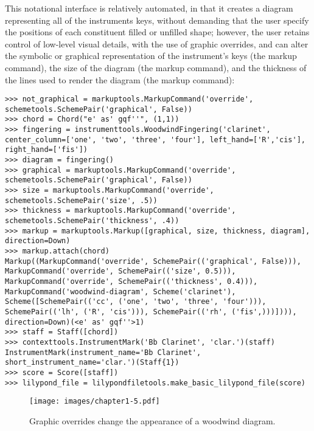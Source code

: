 \noindent This notational interface is relatively automated, in that it creates a diagram representing all of the instruments keys, without demanding that the user specify the positions of each constituent filled or unfilled shape; however, the user retains control of low-level visual details, with the use of graphic overrides, and can alter the symbolic or graphical representation of the instrument's keys (the  markup command), the size of the diagram (the  markup command), and the thickness of the lines used to render the diagram (the  markup command):
\begin{lstlisting}[basicstyle=\scriptsize\ttfamily, breaklines=True, tabsize=4, showtabs=false, showspaces=false]
>>> not_graphical = markuptools.MarkupCommand('override', schemetools.SchemePair('graphical', False))
>>> chord = Chord("e' as' gqf''", (1,1))
>>> fingering = instrumenttools.WoodwindFingering('clarinet', center_column=['one', 'two', 'three', 'four'], left_hand=['R','cis'], right_hand=['fis'])
>>> diagram = fingering()
>>> graphical = markuptools.MarkupCommand('override', schemetools.SchemePair('graphical', False))
>>> size = markuptools.MarkupCommand('override', schemetools.SchemePair('size', .5))
>>> thickness = markuptools.MarkupCommand('override', schemetools.SchemePair('thickness', .4))
>>> markup = markuptools.Markup([graphical, size, thickness, diagram], direction=Down)
>>> markup.attach(chord)
Markup((MarkupCommand('override', SchemePair(('graphical', False))), MarkupCommand('override', SchemePair(('size', 0.5))), MarkupCommand('override', SchemePair(('thickness', 0.4))), MarkupCommand('woodwind-diagram', Scheme('clarinet'), Scheme([SchemePair(('cc', ('one', 'two', 'three', 'four'))), SchemePair(('lh', ('R', 'cis'))), SchemePair(('rh', ('fis',)))]))), direction=Down)(<e' as' gqf''>1)
>>> staff = Staff([chord])
>>> contexttools.InstrumentMark('Bb Clarinet', 'clar.')(staff)
InstrumentMark(instrument_name='Bb Clarinet', short_instrument_name='clar.')(Staff{1})
>>> score = Score([staff])
>>> lilypond_file = lilypondfiletools.make_basic_lilypond_file(score)\end{lstlisting}


\begin{figure}[h!] 
\centering
\texttt{[image: images/chapter1-5.pdf]}

\caption{Graphic overrides change the appearance of a woodwind diagram.} 
\end{figure}

